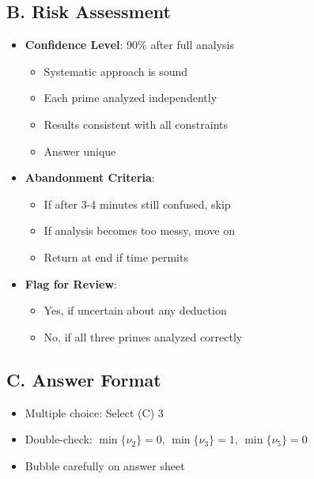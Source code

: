 \documentclass[12pt]{article}
\begin{document}
\begin{competitionbox}
\subsection*{B. Risk Assessment}
\begin{itemize}[leftmargin=*]
    \item \textbf{Confidence Level}: 90\% after full analysis
    \begin{itemize}
        \item Systematic approach is sound
        \item Each prime analyzed independently
        \item Results consistent with all constraints
        \item Answer unique
    \end{itemize}
    \item \textbf{Abandonment Criteria}: 
    \begin{itemize}
        \item If after 3-4 minutes still confused, skip
        \item If analysis becomes too messy, move on
        \item Return at end if time permits
    \end{itemize}
    \item \textbf{Flag for Review}: 
    \begin{itemize}
        \item Yes, if uncertain about any deduction
        \item No, if all three primes analyzed correctly
    \end{itemize}
\end{itemize}

\subsection*{C. Answer Format}
\begin{itemize}[leftmargin=*]
    \item Multiple choice: Select (C) 3
    \item Double-check: $\min\{\nu_2\} = 0$, $\min\{\nu_3\} = 1$, $\min\{\nu_5\} = 0$ \checkmark
    \item Bubble carefully on answer sheet
\end{itemize}
\end{competitionbox}
\end{document}
